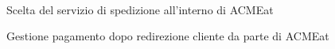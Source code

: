\documentclass[11pt]{article} %
\begin{document}
\begin{figure}[!ht]
\begin{center}
\vspace*{0.5cm}\\
\caption{Scelta del servizio di spedizione all'interno di ACMEat}
\end{center}
\end{figure}

\begin{figure}[!ht]
\begin{center}
\caption{Gestione pagamento dopo redirezione cliente da parte di ACMEat}
\end{center}
\end{figure}
\end{document}
